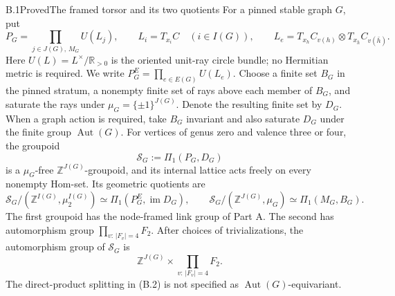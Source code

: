 \begin{result}{B.1}{Proved}{The framed torsor and its two quotients}
For a pinned stable graph $G$, put
\[
 P_G=\prod_{j\in J(G),\,M_G} U(L_j),\qquad
 L_i=T_{x_i}C\quad(i\in I(G)),\qquad
 L_e=T_{x_h}C_{v(h)}\otimes T_{x_{\bar h}}C_{v(\bar h)}.
\]
Here $U(L)=L^{\times}/\mathbb R_{>0}$ is the oriented unit-ray circle
bundle; no Hermitian metric is required.  We write
$P_G^E=\prod_{e\in E(G)}U(L_e)$.  Choose a finite set $B_G$ in the
pinned stratum, a nonempty finite set of rays above each member of
$B_G$, and saturate the rays under
$\mu_G=\{\pm1\}^{J(G)}$.  Denote the resulting finite set by $D_G$.
When a graph action is required, take $B_G$ invariant and also
saturate $D_G$ under the finite group $\operatorname{Aut}(G)$.
For vertices of genus zero and valence three or four, the groupoid
\[
 \mathcal S_G:=\Pi_1(P_G,D_G)
\]
is a $\mu_G$-free $\mathbb Z^{J(G)}$-groupoid, and its internal lattice
acts freely on every nonempty Hom-set.  Its geometric quotients are
\[
 \mathcal S_G/(\mathbb Z^{I(G)},\mu_2^{I(G)})
       \simeq\Pi_1(P_G^E,\operatorname{im}D_G),
 \qquad
 \mathcal S_G/(\mathbb Z^{J(G)},\mu_G)
       \simeq\Pi_1(M_G,B_G).
 \tag{B.1}
\]
The first groupoid has the node-framed link group of Part A.  The
second has automorphism group $\prod_{v:\,|F_v|=4}F_2$.  After choices
of trivializations, the automorphism group of $\mathcal S_G$ is
\[
 \mathbb Z^{J(G)}\times\prod_{v:\,|F_v|=4}F_2.
 \tag{B.2}
\]
The direct-product splitting in (B.2) is not specified as
$\operatorname{Aut}(G)$-equivariant.
\end{result}

